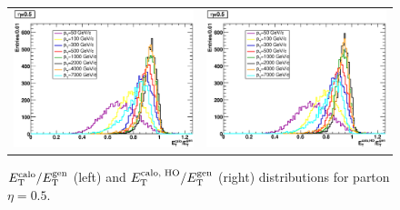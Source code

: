\documentclass{cmspaper}
\begin{document}
\begin{figure}
 \centering
 \begin{tabular}{ll}
  \includegraphics[width=3in]{figs/h_ETRatio_ET_py_corr_eta0.5.eps} &
  \includegraphics[width=3in]{figs/h_ETRatioWithHO_ET_py_corr_eta0.5.eps} \\
 \end{tabular}
 \caption{$E^\text{calo}_\text T/E^\text{gen}_\text T$ (left) and $E^\text{calo, HO}_\text T/E^\text{gen}_\text T$ (right) distributions for parton $\eta=0.5$.}
 \label{fig:ETRatio_dist_05}
\end{figure}
\end{document}
